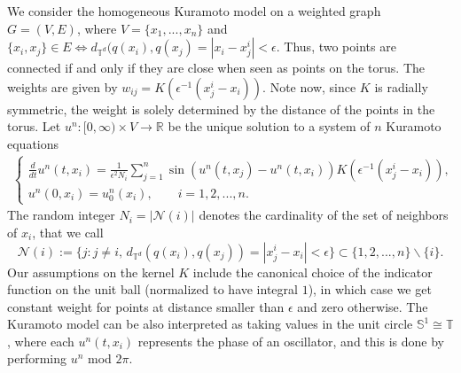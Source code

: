 \documentclass[a4paper,11pt]{amsart}
\newcommand{\red}[1]{{#1}}
\newcommand{\R}{\mathbb{R}}
\newcommand{\T}{\mathbb{T}}
\newcommand{\ep}{\epsilon}
\newcommand{\cN}{\mathcal{N}}
\numberwithin{equation}{section}
\numberwithin{theorem}{section}
\theoremstyle{definition}
\begin{document}
\red{We consider the homogeneous Kuramoto model on a weighted graph $G=(V,E)$, where $V=\{x_1,...,x_n\}$ and $\{x_i,x_j\}\in E \Leftrightarrow d_{\mathbb{T}^d}(q(x_i),q(x_j) = |x_i-x^i_j|<\epsilon$. Thus, two points are connected if and only if they are close when seen as points on the torus. The weights are given by $w_{ij}=K(\ep^{-1}(x^i_j-x_i))$. Note now, since $K$ is radially symmetric, the weight is solely determined by the distance of the points in the torus. Let $u^{n}\colon [0,\infty)\times V\to\R$ be the unique solution to a system of $n$ %
 Kuramoto equations %
\begin{align}
\begin{cases}
\displaystyle{\frac{d}{dt}}u^{n}(t,x_i)=  \displaystyle{\frac{1}{\ep^2N_i}}\sum_{j=1}^n\sin \left(u^{n}(t,x_j)-u^{n}(t,x_i)\right)K\left(\ep^{-1}(x^i_j-x_i)\right), \label{eq:km}\\[10pt]
u^{n}(0,x_i)=u^n_0(x_i), \quad\quad  i=1,2,...,n.
\end{cases}
\end{align}
The random integer $N_i=|\cN(i)|$ denotes the cardinality of the set of neighbors of $x_i$, that we call
$$
\cN(i) :=  \{j \colon j\neq i,\, d_{\mathbb{T}^d}(q(x_i),q(x_j))=|x^i_j-x_i| < \ep\} \subset\{1,2,...,n\}\backslash\{i\}.
$$
}
Our assumptions on the kernel $K$ include the canonical choice of the indicator function on the unit ball (normalized to have integral $1$), in which case we get constant weight for points at distance smaller than $\epsilon$ and zero otherwise. \red{The Kuramoto model can be also interpreted as taking values in the unit circle $\mathbb S^1\cong\T$, where each $u^n(t,x_i)$ represents the phase of an oscillator, and this is done by  performing $u^n$ mod $2\pi$.}
\end{document}
